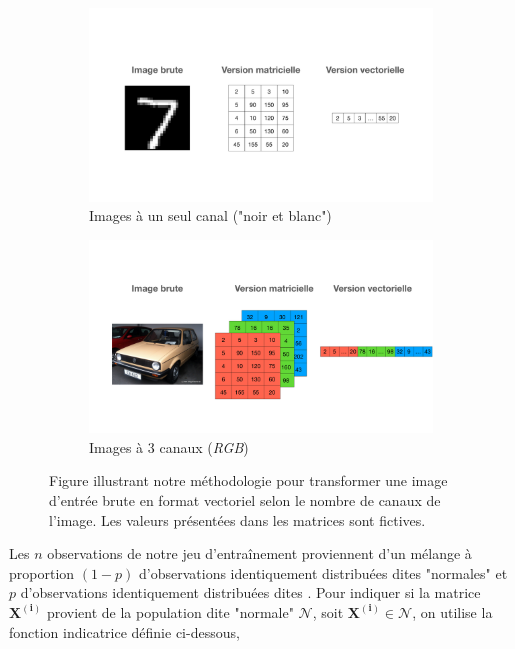 \begin{figure}[h]
	\centering
	\begin{subfigure}{12cm}
		\centering
		\includegraphics[width=1\linewidth]{images/keynote/one-hot-transfo}
		\caption{Images à un seul canal ("noir et blanc")}
	\end{subfigure}
	\begin{subfigure}{12cm}
		\centering
		\includegraphics[width=1\linewidth]{images/keynote/one-hot-transfo-rgb}
		\caption{Images à 3 canaux (\textit{RGB})}
	\end{subfigure}
	\caption{Figure illustrant notre méthodologie pour transformer une image d'entrée brute en format vectoriel selon le nombre de canaux de l'image. Les valeurs présentées dans les matrices sont fictives.}
		\label{fig:one_hot}
\end{figure}


Les $n$ observations de notre jeu d'entraînement proviennent d'un mélange à proportion $(1-p)$ d'observations identiquement distribuées dites "normales" et $p$ d'observations identiquement distribuées dites \DIFdelbegin {}\DIFdelend \DIFaddbegin {}\DIFaddend . Pour indiquer si la matrice $\boldsymbol{X^{(i)}}$ provient de la population dite "normale" $\mathcal{N}$, soit $ \boldsymbol{X^{(i)}}\in\mathcal{N}$, on utilise la fonction indicatrice définie ci-dessous,

